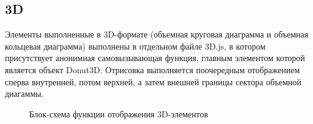 \documentclass[a4paper,14pt]{extreport}
\begin{document}
\subsection{3D}
\hspace{4ex}Элементы выполненные в 3D-формате (объемная круговая диаграмма и объемная кольцевая диаграмма) выполнены в отдельном файле 3D.js, в котором присутствует анонимная самовызывающая функция, главным элементом которой является объект Donut3D. Отрисовка выполняется поочередным отображением сперва внутренней, потом верхней, а затем внешней границы сектора объемной диагаммы.
\newpage
\begin{figure}[h]
\caption{Блок-схема функции отображения 3D-элементов}
\label{ris:image}
\end{figure}
\end{document}
